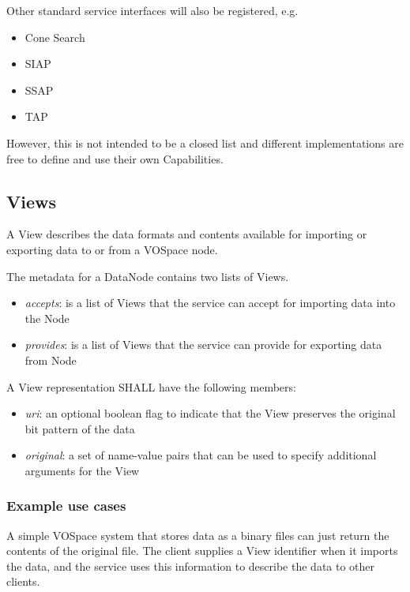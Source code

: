 \documentclass[11pt,a4paper]{ivoa}
\begin{document}
Other standard service interfaces will also be registered, e.g.

\begin{itemize}
    \item Cone Search
    \item SIAP
    \item SSAP
    \item TAP
\end{itemize}

However, this is not intended to be a closed list and different implementations are free to define and use their own Capabilities.

\subsection{Views}
\label{subsec:views}
A View describes the data formats and contents available for importing or exporting data to or from a VOSpace node.

The metadata for a DataNode contains two lists of Views.

\begin{itemize}
    \item \emph{accepts}: is a list of Views that the service can accept for importing data into the Node
    \item \emph{provides}: is a list of Views that the service can provide for exporting data from Node
\end{itemize}

A View representation SHALL have the following members:

\begin{itemize}
    \item \emph{uri}: an optional boolean flag to indicate that the View preserves the original bit pattern of the data
    \item \emph{original}: a set of name-value pairs that can be used to specify additional arguments for the View
\end{itemize}

\subsubsection{Example use cases}
\label{subsubsec:example use cases}
A simple VOSpace system that stores data as a binary files can just return the contents of the original file. The client supplies a View identifier when it imports the data, and the service uses this information to describe the data to other clients.
\end{document}
